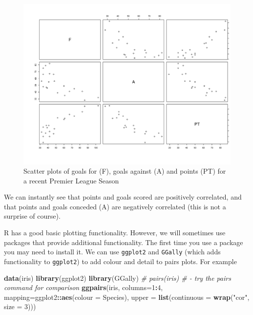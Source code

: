 \documentclass[
]{book}
\newenvironment{Shaded}{\begin{snugshade}}{\end{snugshade}}
\newcommand{\AttributeTok}[1]{\textcolor[rgb]{0.13,0.29,0.53}{#1}}
\newcommand{\CommentTok}[1]{\textcolor[rgb]{0.56,0.35,0.01}{\textit{#1}}}
\newcommand{\DecValTok}[1]{\textcolor[rgb]{0.00,0.00,0.81}{#1}}
\newcommand{\FunctionTok}[1]{\textcolor[rgb]{0.13,0.29,0.53}{\textbf{#1}}}
\newcommand{\NormalTok}[1]{#1}
\newcommand{\SpecialCharTok}[1]{\textcolor[rgb]{0.81,0.36,0.00}{\textbf{#1}}}
\newcommand{\StringTok}[1]{\textcolor[rgb]{0.31,0.60,0.02}{#1}}
\theoremstyle{definition}
\theoremstyle{definition}
\theoremstyle{definition}
\theoremstyle{definition}
\theoremstyle{remark}
\begin{document}
\begin{figure}
\centering
\includegraphics{figs/pairs.png}
\caption{\label{fig:unnamed-chunk-6}Scatter plots of goals for (F), goals against (A) and points (PT) for a recent Premier League Season}
\end{figure}

We can instantly see that points and goals scored are positively correlated, and that points and goals conceded (A) are negatively correlated (this is not a surprise of course).

R has a good basic plotting functionality. However, we will sometimes use packages that provide additional functionality. The first time you use a package you may need to install it. We can use \texttt{ggplot2} and \texttt{GGally} (which adds functionality to \texttt{ggplot2}) to add colour and detail to pairs plots. For example

\begin{Shaded}
\begin{Highlighting}[]
\FunctionTok{data}\NormalTok{(iris)}
\FunctionTok{library}\NormalTok{(ggplot2)}
\FunctionTok{library}\NormalTok{(GGally)}
\CommentTok{\# pairs(iris) \# {-} try the pairs command for comparison}
\FunctionTok{ggpairs}\NormalTok{(iris, }\AttributeTok{columns=}\DecValTok{1}\SpecialCharTok{:}\DecValTok{4}\NormalTok{,  }\AttributeTok{mapping=}\NormalTok{ggplot2}\SpecialCharTok{::}\FunctionTok{aes}\NormalTok{(}\AttributeTok{colour =}\NormalTok{ Species),}
        \AttributeTok{upper =} \FunctionTok{list}\NormalTok{(}\AttributeTok{continuous =} \FunctionTok{wrap}\NormalTok{(}\StringTok{"cor"}\NormalTok{, }\AttributeTok{size =} \DecValTok{3}\NormalTok{)))  }
\end{Highlighting}
\end{Shaded}
\end{document}
